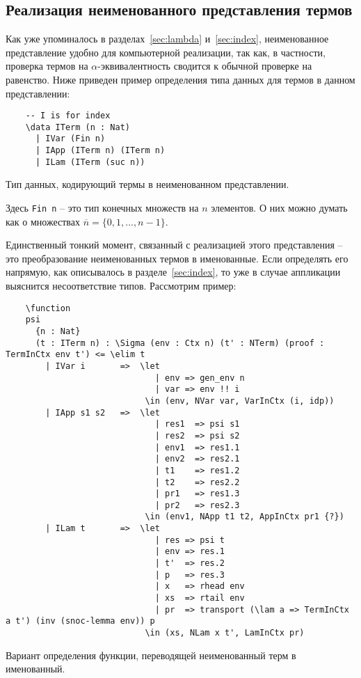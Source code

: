 \subsection{Реализация неименованного представления термов}

Как уже упоминалось в разделах~\ref{sec:lambda} и~\ref{sec:index}, неименованное представление удобно для компьютерной реализации, так как, в частности, проверка термов на $\alpha$-эквивалентность сводится к обычной проверке на равенство. Ниже приведен пример определения типа данных для термов в данном представлении:

\begin{listing}[H]
  \begin{verbatim}
    -- I is for index
    \data ITerm (n : Nat)
      | IVar (Fin n)
      | IApp (ITerm n) (ITerm n)
      | ILam (ITerm (suc n))
  \end{verbatim}
  \caption{Тип данных, кодирующий термы в неименованном представлении.}
\end{listing}

Здесь \texttt{Fin n} -- это тип конечных множеств на $n$ элементов. О них можно думать как о множествах $\overline{n} = \{0,1, \dots, n-1\}$.

Единственный тонкий момент, связанный с реализацией этого представления -- это преобразование неименованных термов в именованные. Если определять его напрямую, как описывалось в разделе~\ref{sec:index}, то уже в случае аппликации выяснится несоответствие типов. Рассмотрим пример:

\begin{listing}[H]
  \begin{verbatim}
    \function
    psi
      {n : Nat}
      (t : ITerm n) : \Sigma (env : Ctx n) (t' : NTerm) (proof : TermInCtx env t') <= \elim t
        | IVar i       =>  \let
                              | env => gen_env n
                              | var => env !! i
                            \in (env, NVar var, VarInCtx (i, idp))
        | IApp s1 s2   =>  \let
                              | res1  => psi s1
                              | res2  => psi s2
                              | env1  => res1.1
                              | env2  => res2.1
                              | t1    => res1.2
                              | t2    => res2.2
                              | pr1   => res1.3
                              | pr2   => res2.3
                            \in (env1, NApp t1 t2, AppInCtx pr1 {?})
        | ILam t       =>  \let
                              | res => psi t
                              | env => res.1
                              | t'  => res.2
                              | p   => res.3
                              | x   => rhead env
                              | xs  => rtail env
                              | pr  => transport (\lam a => TermInCtx a t') (inv (snoc-lemma env)) p
                            \in (xs, NLam x t', LamInCtx pr)
  \end{verbatim}
  \caption{Вариант определения функции, переводящей неименованный терм в именованный.}
\end{listing}

